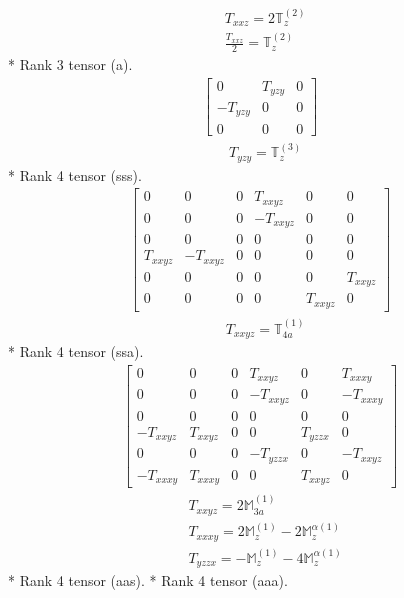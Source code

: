 \documentclass[fleqn,8pt,landscape]{jsarticle}
\begin{document}
\begin{align*}
& T_{xxz} = 2 \mathbb{T}_{z}^{(2)} \\
& \frac{T_{xxz}}{2} = \mathbb{T}_{z}^{(2)}
\end{align*}
* Rank 3 tensor (a).
\begin{align*}
\begin{bmatrix} 0 & T_{yzy} & 0 \\ - T_{yzy} & 0 & 0 \\ 0 & 0 & 0 \end{bmatrix}
\end{align*}
\begin{align*}
& T_{yzy} = \mathbb{T}_{z}^{(3)}
\end{align*}
* Rank 4 tensor (sss).
\begin{align*}
\begin{bmatrix} 0 & 0 & 0 & T_{xxyz} & 0 & 0 \\ 0 & 0 & 0 & - T_{xxyz} & 0 & 0 \\ 0 & 0 & 0 & 0 & 0 & 0 \\ T_{xxyz} & - T_{xxyz} & 0 & 0 & 0 & 0 \\ 0 & 0 & 0 & 0 & 0 & T_{xxyz} \\ 0 & 0 & 0 & 0 & T_{xxyz} & 0 \end{bmatrix}
\end{align*}
\begin{align*}
& T_{xxyz} = \mathbb{T}_{4a}^{(1)}
\end{align*}
* Rank 4 tensor (ssa).
\begin{align*}
\begin{bmatrix} 0 & 0 & 0 & T_{xxyz} & 0 & T_{xxxy} \\ 0 & 0 & 0 & - T_{xxyz} & 0 & - T_{xxxy} \\ 0 & 0 & 0 & 0 & 0 & 0 \\ - T_{xxyz} & T_{xxyz} & 0 & 0 & T_{yzzx} & 0 \\ 0 & 0 & 0 & - T_{yzzx} & 0 & - T_{xxyz} \\ - T_{xxxy} & T_{xxxy} & 0 & 0 & T_{xxyz} & 0 \end{bmatrix}
\end{align*}
\begin{align*}
& T_{xxyz} = 2 \mathbb{M}_{3a}^{(1)} \\
& T_{xxxy} = 2 \mathbb{M}_{z}^{(1)} - 2 \mathbb{M}_{z}^{\alpha(1)} \\
& T_{yzzx} = - \mathbb{M}_{z}^{(1)} - 4 \mathbb{M}_{z}^{\alpha(1)}
\end{align*}
* Rank 4 tensor (aas).
* Rank 4 tensor (aaa).
\end{document}
